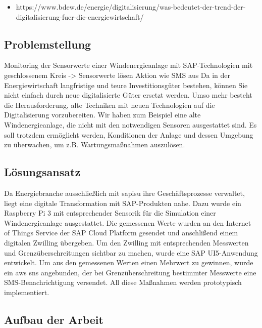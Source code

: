\begin{itemize}
  \item https://www.bdew.de/energie/digitalisierung/was-bedeutet-der-trend-der-digitalisierung-fuer-die-energiewirtschaft/
\end{itemize}

\subsection{Problemstellung}
Monitoring der Sensorwerte einer Windenergieanlage mit SAP-Technologien mit geschlossenem Kreis -> Sensorwerte lösen Aktion wie SMS aus
\newline
Da in der Energiewirtschaft langfristige und teure Investitionsgüter bestehen, können Sie nicht einfach durch neue
digitalisierte Güter ersetzt werden. Umso mehr besteht die Herausforderung, alte Techniken mit neuen Technologien
auf die Digitalisierung vorzubereiten. Wir haben zum Beispiel eine alte Windenergieanlage, die nicht mit den
notwendigen Sensoren ausgestattet sind. Es soll trotzdem ermöglicht werden, Konditionen der Anlage und dessen Umgebung
zu überwachen, um z.B. Wartungsmaßnahmen auszulösen.

\subsection{Lösungsansatz}

Da Energiebranche ausschließlich mit \acf{sapisu} ihre Geschäftsprozesse verwaltet, liegt eine digitale Transformation
mit SAP-Produkten nahe. Dazu wurde ein Raspberry Pi 3 mit entsprechender Sensorik für die Simulation einer Windenergieanlage
ausgestattet. Die gemessenen Werte wurden an den Internet of Things Service der SAP Cloud Platform gesendet und anschlißend
einem digitalen Zwilling übergeben. Um den Zwilling mit entsprechenden Messwerten und Grenzüberschreitungen
sichtbar zu machen, wurde eine SAP UI5-Anwendung entwickelt. Um aus den gemessenen Werten einen Mehrwert zu gewinnen,
wurde ein \acf{aws} \acf{sns} angebunden, der bei Grenzüberschreitung bestimmter Messwerte eine
SMS-Benachrichtigung versendet. All diese Maßnahmen werden prototypisch implementiert.

\subsection{Aufbau der Arbeit}


